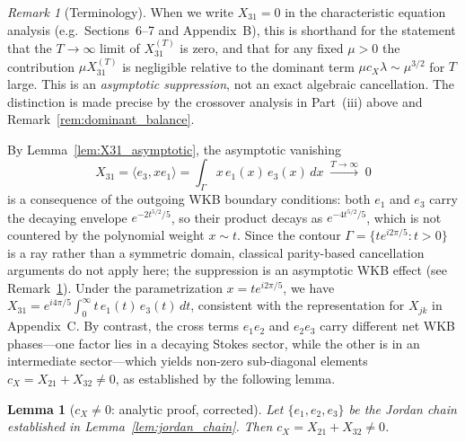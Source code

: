 \documentclass[12pt,a4paper]{amsart}
\newtheorem{lemma}[theorem]{Lemma}
\theoremstyle{remark}
\newtheorem{remark}[theorem]{Remark}
\begin{document}
\begin{remark}[Terminology]
\label{rem:X31_terminology}
When we write $X_{31} = 0$ in the characteristic equation analysis (e.g.\
Sections~6--7 and Appendix~B), this is shorthand for the statement that the
$T\to\infty$ limit of $X_{31}^{(T)}$ is zero, and that for any fixed $\mu > 0$ the
contribution $\mu X_{31}^{(T)}$ is negligible relative to the dominant term
$\mu c_X \lambda \sim \mu^{3/2}$ for $T$ large.  This is an \emph{asymptotic
suppression}, not an exact algebraic cancellation.  The distinction is made precise
by the crossover analysis in Part~(iii) above and Remark~\ref{rem:dominant_balance}.
\end{remark}


By Lemma~\ref{lem:X31_asymptotic}, the asymptotic vanishing
\[
  X_{31} = \langle e_3, x e_1 \rangle
  = \int_\Gamma x\, e_1(x)\, e_3(x)\, dx \;\xrightarrow{T\to\infty}\; 0
\]
is a consequence of the outgoing WKB boundary conditions: both $e_1$ and $e_3$ carry
the decaying envelope $e^{-2t^{5/2}/5}$, so their product decays as $e^{-4t^{5/2}/5}$,
which is not countered by the polynomial weight $x \sim t$.
Since the contour $\Gamma = \{te^{i2\pi/5} : t > 0\}$ is a ray rather than a symmetric
domain, classical parity-based cancellation arguments do not apply here; the suppression
is an asymptotic WKB effect (see Remark~\ref{rem:X31_terminology}).
Under the parametrization $x = te^{i2\pi/5}$, we have
$X_{31} = e^{i4\pi/5}\int_0^\infty t\,e_1(t)\,e_3(t)\,dt$,
consistent with the representation for $X_{jk}$ in Appendix~C.
By contrast, the cross terms $e_1 e_2$ and $e_2 e_3$ carry
different net WKB phases---one factor lies in a decaying Stokes sector,
while the other is in an intermediate sector---which yields
non-zero sub-diagonal elements $c_X = X_{21} + X_{32} \neq 0$,
as established by the following lemma.

\begin{lemma}[$c_X \neq 0$: analytic proof, corrected]
\label{lem:cx_nonzero}
Let $\{e_1, e_2, e_3\}$ be the Jordan chain established in Lemma~\ref{lem:jordan_chain}.
Then $c_X = X_{21} + X_{32} \neq 0$.
\end{lemma}
\end{document}

